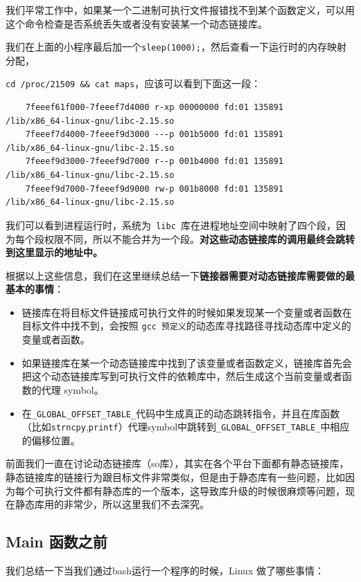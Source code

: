 \documentclass[UTF8,a4paper,12pt]{ctexbook}
\begin{document}
			我们平常工作中，如果某一个二进制可执行文件报错找不到某个函数定义，可以用这个命令检查是否系统丢失或者没有安装某一个动态链接库。
			
			我们在上面的小程序最后加一个\verb|sleep(1000);|，然后查看一下运行时的内存映射分配，
			
			\verb|cd /proc/21509 && cat maps|，应该可以看到下面这一段：
			\begin{lstlisting}
	7feeef61f000-7feeef7d4000 r-xp 00000000 fd:01 135891                     /lib/x86_64-linux-gnu/libc-2.15.so
	7feeef7d4000-7feeef9d3000 ---p 001b5000 fd:01 135891                     /lib/x86_64-linux-gnu/libc-2.15.so
	7feeef9d3000-7feeef9d7000 r--p 001b4000 fd:01 135891                     /lib/x86_64-linux-gnu/libc-2.15.so
	7feeef9d7000-7feeef9d9000 rw-p 001b8000 fd:01 135891                     /lib/x86_64-linux-gnu/libc-2.15.so
			\end{lstlisting}
			
			我们可以看到进程运行时，系统为\verb| libc |库在进程地址空间中映射了四个段，因为每个段权限不同，所以不能合并为一个段。\textbf{对这些动态链接库的调用最终会跳转到这里显示的地址中。}
			
			根据以上这些信息，我们在这里继续总结一下\textbf{链接器需要对动态链接库需要做的最基本的事情}：
			\begin{itemize}[itemindent = 1em]
				\item 链接库在将目标文件链接成可执行文件的时候如果发现某一个变量或者函数在目标文件中找不到，会按照 \verb|gcc 预定义|的动态库寻找路径寻找动态库中定义的变量或者函数。
				\item 如果链接库在某一个动态链接库中找到了该变量或者函数定义，链接库首先会把这个动态链接库写到可执行文件的依赖库中，然后生成这个当前变量或者函数的代理 symbol。
				\item  在\verb|_GLOBAL_OFFSET_TABLE_|代码中生成真正的动态跳转指令，并且在库函数（比如\verb|strncpy|,\verb|printf|）代理symbol中跳转到\verb|_GLOBAL_OFFSET_TABLE_|中相应的偏移位置。
			\end{itemize}
			
			前面我们一直在讨论动态链接库（so库），其实在各个平台下面都有静态链接库，静态链接库的链接行为跟目标文件非常类似，但是由于静态库有一些问题，比如因为每个可执行文件都有静态库的一个版本，这导致库升级的时候很麻烦等问题，现在静态库用的非常少，所以这里我们不去深究。
			
		\subsection{Main 函数之前}
			我们总结一下当我们通过bash运行一个程序的时候，Linux 做了哪些事情：
				
\end{document}
